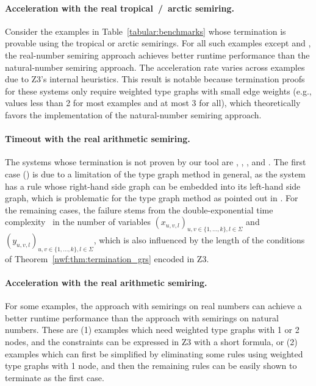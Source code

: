 \paragraph{Acceleration with the real tropical~/~arctic semiring.} 
Consider the examples in Table~\ref{tabular:benchmarks} whose termination is provable using the tropical or arctic semirings. For all such examples except \cite[Example 5]{plump2018modular} and \cite[Example 4]{bruggink2015proving}, the real-number semiring approach achieves better runtime performance than the natural-number semiring approach. The acceleration rate varies across examples due to Z3's internal heuristics. This result is notable because termination proofs for these systems only require weighted type graphs with small edge weights (e.g., values less than 2 for most examples and at most 3 for all), which theoretically favors the implementation of the natural-number semiring approach.

\paragraph{Timeout with the real arithmetic semiring.}
The systems whose termination is not proven by our tool are \cite[Example 6]{plump2018modular}, \cite[Examples 5 and 6]{bruggink2015proving}, \cite[Example 4]{plump2018modular}, and \cite[Example 5]{bruggink2014termination}.
The first case (\cite[Example 6]{plump2018modular}) is due to a limitation of the type graph method in general, as the system has a rule whose right-hand side graph can be embedded into its left-hand side graph, which is problematic for the type graph method as pointed out in \cite[Example D.4]{endrullis2024generalized_arxiv_v2}. For the remaining cases,
 the failure stems from the double-exponential time complexity~\cite{collins1974quantifier,z3realarithmetic} in the number of variables \( (x_{u,v,l})_{u,v \mathop{\in} \{1,...,k\}, l \mathop{\in} \Sigma} \) and \( (y_{u,v,l})_{u,v \mathop{\in} \{1,...,k\}, l \mathop{\in} \Sigma} \), which is also influenced by the length of the conditions of Theorem~\ref{nwf:thm:termination_grs} encoded in Z3.
\paragraph{Acceleration with the real arithmetic semiring.} For some examples, the approach with semirings on real numbers can achieve a better runtime performance than the approach with semirings on natural numbers. These are (1) examples which need weighted type graphs with 1 or 2 nodes, and the constraints can be expressed in Z3 with a short formula, or (2) examples which can first be simplified by eliminating some rules using weighted type graphs with 1 node, and then the remaining rules can be 
easily shown to terminate
as the first case.
